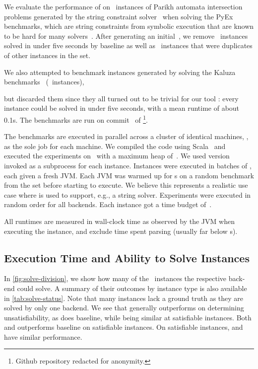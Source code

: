 
We evaluate the performance of \Catra{} on~\NrBenchmarks{} instances of Parikh
automata intersection problems generated by the \OstrichPlus{} string constraint
solver~\cite{ostrich-plus} when solving the PyEx benchmarks, 
which are string constraints from symbolic execution that are known
to be hard for many solvers~\cite{pyex}. After generating an
initial~\InitialNrBenchmarks{}, we remove~\NrTrivial{} instances solved in under
five seconds by baseline as well as~\NrInvalid{} instances that were duplicates of other instances in the set.

 We also attempted to benchmark instances generated by
\OstrichPlus{} solving the Kaluza benchmarks~\cite{Saxena10:kaluza}
(~instances),
\iffalse
and pyex-len
(\numprint{791}~instances) benchmark suites\fi
but discarded them since they all turned out to be trivial for our tool
\Catra{}: every instance
could be solved in under five seconds, with a mean runtime of about 0.1s.
The benchmarks are run
on commit~\texttt{\commit} of \Catra{}\footnote{Github repository redacted for anonymity.}.

The benchmarks are executed in parallel across a cluster of identical
machines, \BenchmarkRig{}, as the sole job for each machine.  We compiled
the code using Scala~\ScalaVersion{} and executed the experiments
on~\JvmVersion{} with a maximum heap of~\MaxHeapSize{}. We used \Nuxmv{}
version~\NuxmvVersion{} invoked as a subprocess for each instance. Instances
were executed in batches of \BatchSize{}, each given a fresh JVM. Each JVM was
warmed up for s on a random benchmark from the set before starting
to execute. We believe this represents a realistic use case where \Calculus{} is
used to support, e.g., a string solver. Experiments were executed in random order
for all backends. Each instance got a time budget of~\RuntimeTimeout{}.

All runtimes are measured in wall-clock time as observed by the JVM when
executing the instance, and exclude time spent parsing (usually far below
s).

\subsection{Execution Time and Ability to Solve Instances}\label{sec:runtime}

In \cref{fig:solve-division}, we show how many of the~\NrBenchmarks{} instances
the respective back-end could solve. A summary of their outcomes by instance
type is also available in \cref{tab:solve-status}. Note that many instances lack
a ground truth as they are solved by only one backend. We see that
\Calculus{} generally outperforms \Nuxmv{} on determining unsatisfiability, as
does baseline, while being similar at satisfiable instances. Both \Calculus{} and
\Nuxmv{} outperforms baseline on satisfiable instances. On satisfiable
instances, \Nuxmv{} and \Calculus{} have similar performance.

